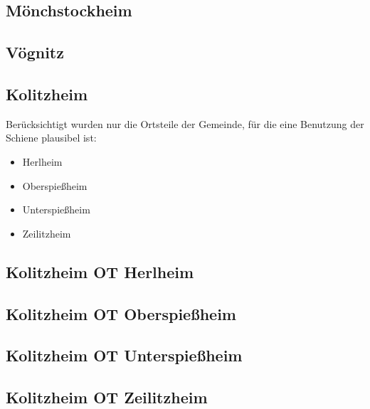 \documentclass[fontsize=12pt,a4paper]{scrreprt}
\begin{document}
                \subsection{Mönchstockheim}
                
                
                \subsection{Vögnitz}
                
                
                \subsection{Kolitzheim}
                Berücksichtigt wurden nur die Ortsteile der Gemeinde, für die eine Benutzung der Schiene plausibel ist:\newline
                \begin{itemize}[nosep]
                    \item Herlheim
                    \item Oberspießheim
                    \item Unterspießheim
                    \item Zeilitzheim
                \end{itemize}
                
                \subsection{Kolitzheim OT Herlheim}
                
                
                \subsection{Kolitzheim OT Oberspießheim}
                
                
                \subsection{Kolitzheim OT Unterspießheim}
                
                
                \subsection{Kolitzheim OT Zeilitzheim}
                
                
\end{document}
